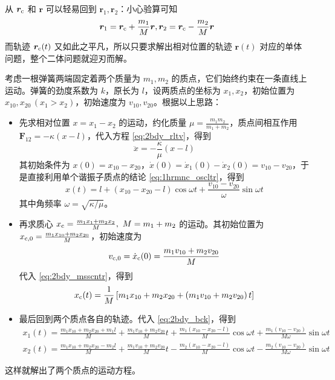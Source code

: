 \documentclass[cn,10pt,math=newtx,citestyle=gb7714-2015,bibstyle=gb7714-2015]{elegantbook}
\def\bm{\boldsymbol}
\begin{document}
从 $\bm r_\text c$ 和 $\bm r$ 可以轻易回到 $\bm r_1,\bm r_2$：小心验算可知
\begin{equation}\label{eq:2bdy_bck}
    \bm r_1 = \bm r_\text c+\frac{m_1}{M}\bm r, \bm r_2 = \bm r_\text c-\frac{m_2}{M}\bm r
\end{equation}
而轨迹 $\bm r_\text c(t)$ 又如此之平凡，所以只要求解出相对位置的轨迹 $\bm r(t)$ 对应的单体问题，整个二体问题就迎刃而解。

\begin{instance}[谐振子两体问题]
    考虑一根弹簧两端固定着两个质量为 $m_1,m_2$ 的质点，它们始终约束在一条直线上运动。弹簧的劲度系数为 $k$，原长为 $l$，设两质点的坐标为 $x_1,x_2$，初始位置为 $x_{10},x_{20}\, (x_1>x_2)$，初始速度为 $v_{10},v_{20}$。根据以上思路：
    \begin{itemize}
        \item 先求相对位置 $x=x_1-x_2$ 的运动，约化质量 $\mu = \frac{m_1m_2}{m_1+m_2}$，质点间相互作用 $\bm F_{12} = -\kappa (x-l)$，代入方程 \ref{eq:2bdy_rltv}，得到
        \begin{equation*}
            \ddot{x} = -\frac{\kappa}{\mu} (x-l)
        \end{equation*}
        其初始条件为 $x(0) = x_{10}-x_{20}$，$\dot{x}(0) = \dot{x}_1(0)-\dot{x}_2(0) = v_{10}-v_{20}$，于是直接利用单个谐振子质点的结论 \ref{eq:1hrmnc_oscltr}，得到
        \begin{equation*}
            x(t) = l + \left(x_{10}-x_{20}-l\right)\cos\omega t+\frac{v_{10}-v_{20}}{\omega}\sin\omega t
        \end{equation*}
        其中角频率 $\omega=\sqrt{\kappa/\mu}$。
        \item 再求质心 $x_{\text c}=\frac{m_1x_1+m_2x_2}{M},\ M=m_1+m_2$ 的运动。其初始位置为 $x_{\text c,0}=\frac{m_1x_{10}+m_2x_{20}}{M}$，初始速度为
        \begin{equation*}
            v_{\text c,0} = \dot{x}_{\text c}(0) = \frac{m_1v_{10}+m_2v_{20}}{M}
        \end{equation*}
        代入 \ref{eq:2bdy_msscntr}，得到
        \begin{equation*}
            x_{\text c}(t) = \frac{1}{M}\left[m_1x_{10}+m_2x_{20} + \left(m_1v_{10}+m_2v_{20}\right)t\right]
        \end{equation*}
        \item 最后回到两个质点各自的轨迹。代入 \ref{eq:2bdy_bck}，得到
        \begin{gather*}
            x_1(t) = \frac{m_1x_{10}+m_2x_{20}+m_1l}{M}+\frac{m_1v_{10}+m_2v_{20}}{M}t + \frac{m_1(x_{10}-x_{20}-l)}{M}\cos\omega t +\frac{m_1(v_{10}-v_{20})}{M\omega}\sin\omega t\\
            x_2(t) = \frac{m_1x_{10}+m_2x_{20}-m_2l}{M}+\frac{m_1v_{10}+m_2v_{20}}{M}t - \frac{m_2(x_{10}-x_{20}-l)}{M}\cos\omega t -\frac{m_2(v_{10}-v_{20})}{M\omega}\sin\omega t
        \end{gather*}
    \end{itemize}
    这样就解出了两个质点的运动方程。
\end{instance}
\end{document}
